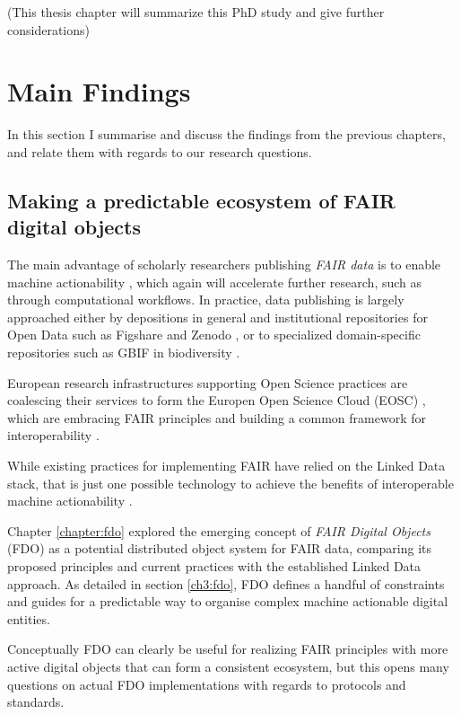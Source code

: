 (This thesis chapter will summarize this PhD study and give further
considerations)

\section{Main Findings}

In this section I summarise and discuss the findings from the previous chapters, and relate them with regards to our research questions.


\subsection{Making a predictable ecosystem of FAIR digital objects}

The main advantage of scholarly researchers publishing \emph{FAIR data} is to enable machine actionability \cite{Wilkinson 2016}, which again will accelerate further research, such as through computational workflows. 
In practice, data publishing is largely approached either by depositions in general and institutional repositories for Open Data such as Figshare and Zenodo \cite{Dillen 2019}, or to specialized domain-specific repositories such as GBIF in biodiversity \cite{ch8-7}. 

European research infrastructures supporting Open Science practices are coalescing their services to form the Europen Open Science Cloud (EOSC) \cite{10.2777/940154}, which are embracing FAIR principles \cite{Mons 2017} and building a common framework for interoperability \cite{eosc-interop-framework}. 

While existing practices for implementing FAIR have relied on the Linked Data stack, that is just one possible technology to achieve the benefits of interoperable machine actionability \cite{Mons 2017}. 

Chapter \ref{chapter:fdo} explored the emerging concept of \emph{FAIR Digital Objects} (FDO) \cite{Schultes 2019} as a potential distributed object system for FAIR data, comparing its proposed principles and current practices with the established Linked Data approach. 
As detailed in section \vref{ch3:fdo}, FDO defines a handful of constraints and guides for a predictable way to organise complex machine actionable digital entities. 

Conceptually FDO can clearly be useful for realizing FAIR principles with more active digital objects that can form a consistent ecosystem, but this opens many questions on actual FDO implementations with regards to protocols and standards.

